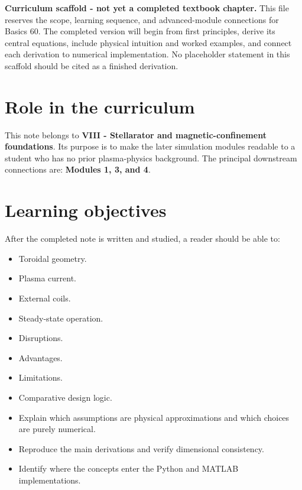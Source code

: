\documentclass[11pt]{article}
\begin{document}

\begin{overviewbox}
\textbf{Curriculum scaffold - not yet a completed textbook chapter.} This file reserves the scope, learning sequence, and advanced-module connections for Basics 60. The completed version will begin from first principles, derive its central equations, include physical intuition and worked examples, and connect each derivation to numerical implementation. No placeholder statement in this scaffold should be cited as a finished derivation.
\end{overviewbox}

\ProjectTOC

\section{Role in the curriculum}
This note belongs to \textbf{VIII - Stellarator and magnetic-confinement foundations}. Its purpose is to make the later simulation modules readable to a student who has no prior plasma-physics background. The principal downstream connections are: \textbf{Modules 1, 3, and 4}.

\section{Learning objectives}
After the completed note is written and studied, a reader should be able to:
\begin{itemize}[leftmargin=1.6em]
\item Toroidal geometry.
\item Plasma current.
\item External coils.
\item Steady-state operation.
\item Disruptions.
\item Advantages.
\item Limitations.
\item Comparative design logic.
\item Explain which assumptions are physical approximations and which choices are purely numerical.
\item Reproduce the main derivations and verify dimensional consistency.
\item Identify where the concepts enter the Python and MATLAB implementations.
\end{itemize}
\end{document}
